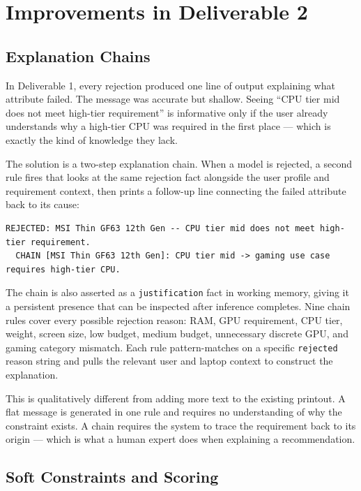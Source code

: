 \documentclass[12pt,a4paper]{article}
\begin{document}
\section{Improvements in Deliverable 2}

\subsection{Explanation Chains}

In Deliverable 1, every rejection produced one line of output explaining what attribute failed. The message was accurate but shallow. Seeing ``CPU tier mid does not meet high-tier requirement'' is informative only if the user already understands why a high-tier CPU was required in the first place --- which is exactly the kind of knowledge they lack.

The solution is a two-step explanation chain. When a model is rejected, a second rule fires that looks at the same rejection fact alongside the user profile and requirement context, then prints a follow-up line connecting the failed attribute back to its cause:

\begin{lstlisting}[style=output]
REJECTED: MSI Thin GF63 12th Gen -- CPU tier mid does not meet high-tier requirement.
  CHAIN [MSI Thin GF63 12th Gen]: CPU tier mid -> gaming use case requires high-tier CPU.
\end{lstlisting}

The chain is also asserted as a \texttt{justification} fact in working memory, giving it a persistent presence that can be inspected after inference completes. Nine chain rules cover every possible rejection reason: RAM, GPU requirement, CPU tier, weight, screen size, low budget, medium budget, unnecessary discrete GPU, and gaming category mismatch. Each rule pattern-matches on a specific \texttt{rejected} reason string and pulls the relevant user and laptop context to construct the explanation.

This is qualitatively different from adding more text to the existing printout. A flat message is generated in one rule and requires no understanding of why the constraint exists. A chain requires the system to trace the requirement back to its origin --- which is what a human expert does when explaining a recommendation.

\subsection{Soft Constraints and Scoring}
\end{document}
